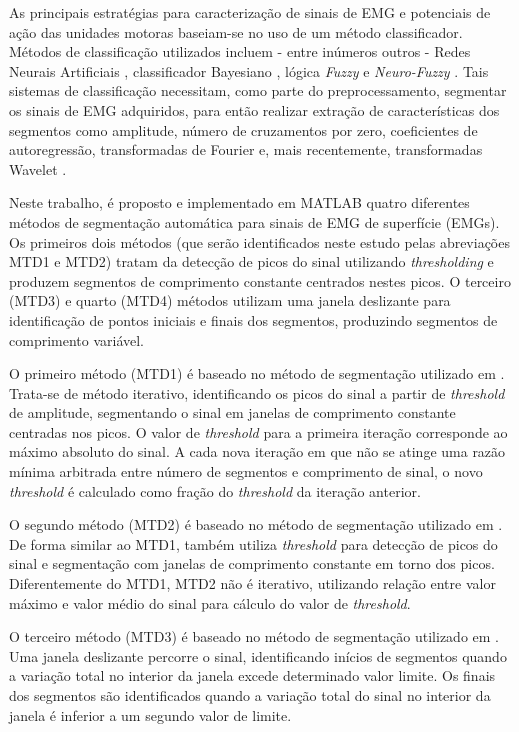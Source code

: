 As principais estratégias para caracterização de sinais de EMG e potenciais de ação das unidades motoras baseiam-se no uso de um método classificador. Métodos de classificação utilizados incluem - entre inúmeros outros - Redes Neurais Artificiais \cite{Hudgins1993}, classificador Bayesiano \cite{Englehart2003}, lógica \emph{Fuzzy} \cite{Chan2000} e \emph{Neuro-Fuzzy} \cite{Favieiro2011}. Tais sistemas de classificação necessitam, como parte do preprocessamento, segmentar os sinais de EMG adquiridos, para então realizar extração de características dos segmentos como amplitude, número de cruzamentos por zero, coeficientes de autoregressão, transformadas de Fourier e, mais recentemente, transformadas Wavelet \cite{Jun-UkChu2007}.

Neste trabalho, é proposto e implementado em MATLAB quatro diferentes métodos de segmentação automática para sinais de EMG de superfície (EMGs). Os primeiros dois métodos (que serão identificados neste estudo pelas abreviações MTD1 e MTD2) tratam da detecção de picos do sinal utilizando \emph{thresholding} e produzem segmentos de comprimento constante centrados nestes picos. O terceiro (MTD3) e quarto (MTD4) métodos utilizam uma janela deslizante para identificação de pontos iniciais e finais dos segmentos, produzindo segmentos de comprimento variável.

O primeiro método (MTD1) é baseado no método de segmentação utilizado em \cite{Chauvet2001}. Trata-se de método iterativo, identificando os picos do sinal a partir de \emph{threshold} de amplitude, segmentando o sinal em janelas de comprimento constante centradas nos picos. O valor de \emph{threshold} para a primeira iteração corresponde ao máximo absoluto do sinal. A cada nova iteração em que não se atinge uma razão mínima arbitrada entre número de segmentos e comprimento de sinal, o novo \emph{threshold} é calculado como fração do \emph{threshold} da iteração anterior.

O segundo método (MTD2) é baseado no método de segmentação utilizado em \cite{Katsis2006}. De forma similar ao MTD1, também utiliza \emph{threshold} para detecção de picos do sinal e segmentação com janelas de comprimento constante em torno dos picos. Diferentemente do MTD1, MTD2 não é iterativo, utilizando relação entre valor máximo e valor médio do sinal para cálculo do valor de \emph{threshold}.

O terceiro método (MTD3) é baseado no método de segmentação utilizado em \cite{Gut2000}. Uma janela deslizante percorre o sinal, identificando inícios de segmentos quando a variação total no interior da janela excede determinado valor limite. Os finais dos segmentos são identificados quando a variação total do sinal no interior da janela é inferior a um segundo valor de limite.

